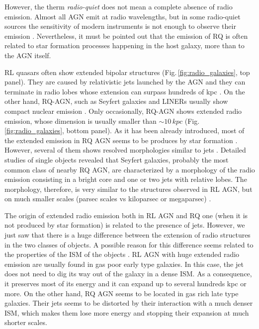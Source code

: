 \documentclass[../main.tex]{subfiles}
\begin{document}
However, the therm \emph{radio-quiet} does not mean a complete absence of radio emission.
Almost all AGN emit at radio wavelengths, but in some radio-quiet sources the sensitivity of modern instruments is not enough to observe their emission \citep{Kellermann16}.
Nevertheless, it must be pointed out that the emission of RQ is often related to star formation processes happening in the host galaxy, more than to the AGN itself.

RL quasars often show extended bipolar structures (Fig.\,\ref{fig:radio_galaxies}, top panel).
They are caused by relativistic jets launched by the AGN and they can terminate in radio lobes whose extension can surpass hundreds of kpc \citep[e.g][]{Fanaroff74,Perley79,Bridle94}.
On the other hand, RQ-AGN, such as Seyfert galaxies and LINERs usually show compact nuclear emission \citep{Singh15}.
Only occasionally, RQ-AGN shows extended radio emission, whose dimension is usually smaller than $\sim 10\,\si{kpc}$ (Fig.\,\ref{fig:radio_galaxies}, bottom panel).
As it has been already introduced, most of the extended emission in RQ AGN seems to be produces by star formation \citep{Baum93, Kellermann16}.
However, several of them shows resolved morphologies similar to jets \citep{Baum93,Colbert96,Morganti99,Gallimore06,Singh15, Singh15b}.
Detailed studies of single objects revealed that Seyfert galaxies, probably the most common class of nearby RQ AGN, are characterized by a morphology of the radio emission consisting in a bright core and one or two jets with relative lobes.
The morphology, therefore, is very similar to the structures observed in RL AGN, but on much smaller scales (parsec scales vs kiloparsec or megaparsec) \citep[e.g.][]{Wrobel84,Ulvestad87,Morganti99,Kukula99,Momjian03,Kharb06}.

The origin of extended radio emission both in RL AGN and RQ one (when it is not produced by star formation) is related to the presence of jets.
However, we just saw that there is a huge difference between the extension of radio structures in the two classes of objects.
A possible reason for this difference seems related to the properties of the ISM of the objects \citep{Whittle04,Gallimore06,Schawinski11,Singh15b}.
RL AGN with huge extended radio emission are usually found in gas poor early type galaxies.
In this case, the jet does not need to dig its way out of the galaxy in a dense ISM.
As a consequence, it preserves most of its energy and it can expand up to several hundreds kpc or more.
On the other hand, RQ AGN seems to be located in gas rich late type galaxies.
Their jets seems to be distorted by their interaction with a much denser ISM, which makes them lose more energy and stopping their expansion at much shorter scales.
\end{document}
